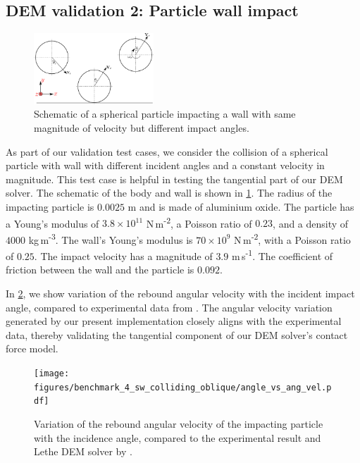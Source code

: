 \documentclass[preprint,12pt]{elsarticle}
\begin{document}
\subsection{DEM validation 2: Particle wall impact}
\label{sec:DEM_validation_2_particle_wall_impact}
\begin{figure}[!htpb]
  \centering
  \includegraphics[width=0.4\textwidth]{images/results_dem_2_validation_particle_wall_impact/schematic}
  \caption{Schematic of a spherical particle impacting a wall
    with same magnitude of velocity but different impact angles.}
  \label{fig:result:dem_sw_contact_schematic}
\end{figure}
As part of our validation test cases, we consider the collision of a spherical
particle with wall with different incident angles and a constant velocity in
magnitude. This test case is helpful in testing the tangential part of our DEM
solver. The schematic of the body and wall is shown in
\cref{fig:result:dem_sw_contact_schematic}. The radius of the impacting
particle is $0.0025$ m and is made of aluminium oxide. The particle has a
Young's modulus of $3.8 \times 10^{11}$ N\,m\textsuperscript{-2}, a Poisson ratio
of $0.23$, and a density of $4000$ kg\,m\textsuperscript{-3}. The
wall's Young's modulus is $70\times 10^{9}$ N\,m\textsuperscript{-2}, with a
Poisson ratio of $0.25$.  The impact velocity has a magnitude of $3.9$
m\,s\textsuperscript{-1}. The coefficient of friction between the wall and the
particle is $0.092$.


In \cref{fig:result:dem_sw_contact_omega_vs_theta}, we show variation of the
rebound angular velocity with the incident impact angle, compared to
experimental data from \citet{kharaz2001experimental}.  The angular velocity
variation generated by our present implementation closely aligns with the
experimental data, thereby validating the tangential component of our DEM
solver's contact force model.
\begin{figure}[!htpb]
  \centering
  \texttt{[image: figures/benchmark\_4\_sw\_colliding\_oblique/angle\_vs\_ang\_vel.pdf]}
  \caption{Variation of the rebound angular velocity of the impacting particle
    with the incidence angle, compared to the experimental result and Lethe
    DEM solver by \cite{golshan2023lethe}.}
  \label{fig:result:dem_sw_contact_omega_vs_theta}
\end{figure}
\end{document}
